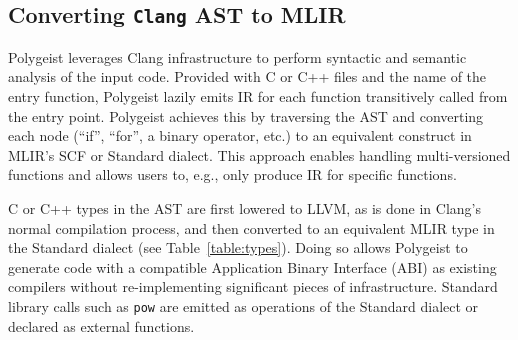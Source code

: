 \documentclass[sigplan]{acmart}
\newcommand{\icode}[1]{{\texttt {#1}}}
\newcommand{\tool}{Polygeist\xspace}
\begin{document}
\subsection{Converting \icode{Clang} AST to MLIR}
\tool leverages Clang infrastructure to perform syntactic and semantic analysis of the input code. Provided with C or C++ files and the name of the entry function, \tool lazily emits IR for each function transitively called from the entry point. \tool achieves this by traversing the AST and converting each node (``if'', ``for'', a binary operator, etc.) to an equivalent construct in MLIR's SCF or Standard dialect. This approach enables handling multi-versioned functions and allows users to, e.g., only produce IR for specific functions.

C or C++ types in the AST are first lowered to LLVM, as is done in Clang's normal compilation process, and then converted to an equivalent MLIR type in the Standard dialect (see Table~\ref{table:types}). Doing so allows \tool to generate code with a compatible Application Binary Interface (ABI) as existing compilers without re-implementing significant pieces of infrastructure. Standard library calls such as \icode{pow} are emitted as operations of the Standard dialect or declared as external functions.

\begin{table}[]
  \centering
  \caption{Type correspondence between C, LLVM IR and MLIR Standard types.}
  \label{table:types}
\end{table}
\end{document}
